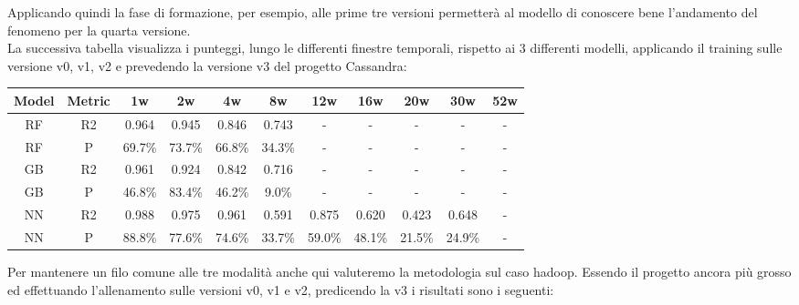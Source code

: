\documentclass[%
    corpo=12pt,
    twoside,
    oldstyle,
    autoretitolo,
    greek,
    evenboxes,
]{toptesi}
\begin{document}
Applicando quindi la fase di formazione, per esempio, alle prime tre versioni permetterà al modello di conoscere bene l'andamento del fenomeno per la quarta versione.\\
La successiva tabella visualizza i punteggi, lungo le differenti finestre temporali, rispetto ai 3 differenti modelli, applicando il training sulle versione v0, v1, v2 e prevedendo la versione v3 del progetto Cassandra:
\begin{center}
   \label{tab:cross_version_cassandra}
  \begin{tabular}{ |c|c|c|c|c|c|c|c|c|c|c| }
    \hline
    \textbf{Model} & \textbf{Metric} & \textbf{1w} & \textbf{2w} & \textbf{4w} & \textbf{8w} & \textbf{12w} & \textbf{16w} & \textbf{20w} & \textbf{30w}  & \textbf{52w} \\
    \hline
    \hline
    RF & R2 & 0.964 & 0.945 & 0.846 & 0.743 & - & - & - & - & -\\
    \hline
    RF & P & 69.7\% & 73.7\% & 66.8\% & 34.3\% & - & - & - & - & -\\
    \hline
    \hline
    GB & R2 & 0.961 & 0.924 & 0.842 & 0.716 & - & - & - & - & -\\
    \hline
    GB & P & 46.8\% & 83.4\% & 46.2\% & 9.0\% & - & - & - & - & -\\
    \hline
    \hline
    NN & R2 & 0.988 & 0.975 & 0.961 & 0.591 & 0.875 & 0.620 & 0.423 & 0.648 & -\\
    \hline
    NN & P & 88.8\% & 77.6\% & 74.6\% & 33.7\% & 59.0\% & 48.1\% & 21.5\% & 24.9\% & -\\
    \hline
  \end{tabular}
\end{center}
Per mantenere un filo comune alle tre modalità anche qui valuteremo la metodologia sul caso hadoop. Essendo il progetto ancora più grosso ed effettuando l'allenamento sulle versioni v0, v1 e v2, predicendo la v3 i risultati sono i seguenti:
\end{document}
